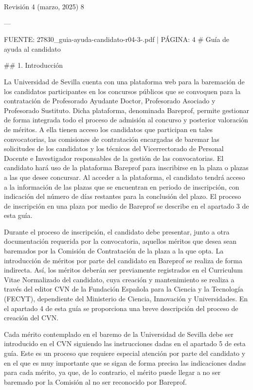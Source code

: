 \documentclass{article}
\begin{document}
\begin{itemize}
\begin{itemize}
\begin{scriptsize}
                  Revisión 4 (marzo, 2025) 8

                  ---

                  FUENTE: 27830\_guia-ayuda-candidato-r04-3-.pdf | PÁGINA: 4
                  \# Guía de ayuda al candidato

                  \#\# 1. Introducción

                  La Universidad de Sevilla cuenta con una plataforma web para la baremación de los candidatos participantes en los concursos públicos que se convoquen para la contratación de Profesorado Ayudante Doctor, Profesorado Asociado y Profesorado Sustituto. Dicha plataforma, denominada Bareprof, permite gestionar de forma integrada todo el proceso de admisión al concurso y posterior valoración de méritos. A ella tienen acceso los candidatos que participan en tales convocatorias, las comisiones de contratación encargadas de baremar las solicitudes de los candidatos y los técnicos del Vicerrectorado de Personal Docente e Investigador responsables de la gestión de las convocatorias. El candidato hará uso de la plataforma Bareprof para inscribirse en la plaza o plazas a las que desee concursar. Al acceder a la plataforma, el candidato tendrá acceso a la información de las plazas que se encuentran en periodo de inscripción, con indicación del número de días restantes para la conclusión del plazo. El proceso de inscripción en una plaza por medio de Bareprof se describe en el apartado 3 de esta guía.

                  Durante el proceso de inscripción, el candidato debe presentar, junto a otra documentación requerida por la convocatoria, aquellos méritos que desea sean baremados por la Comisión de Contratación de la plaza a la que opta. La introducción de méritos por parte del candidato en Bareprof se realiza de forma indirecta. Así, los méritos deberán ser previamente registrados en el Curriculum Vitae Normalizado del candidato, cuya creación y mantenimiento se realiza a través del editor CVN de la Fundación Española para la Ciencia y la Tecnología (FECYT), dependiente del Ministerio de Ciencia, Innovación y Universidades. En el apartado 4 de esta guía se proporciona una breve descripción del proceso de creación del CVN.

                  Cada mérito contemplado en el baremo de la Universidad de Sevilla debe ser introducido en el CVN siguiendo las instrucciones dadas en el apartado 5 de esta guía. Este es un proceso que requiere especial atención por parte del candidato y en el que es muy importante que se sigan de forma precisa las indicaciones dadas para cada mérito, ya que, de lo contrario, el mérito puede llegar a no ser baremado por la Comisión al no ser reconocido por Bareprof.


\end{scriptsize}
\end{itemize}
\end{itemize}
\end{document}

